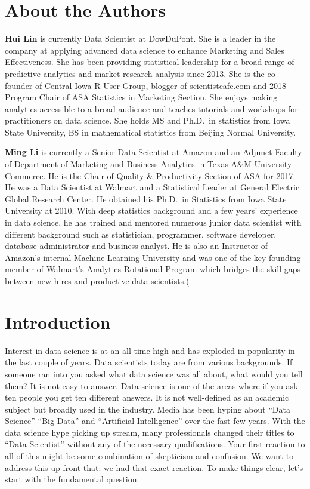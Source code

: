 \documentclass[12pt,]{krantz}
\theoremstyle{definition}
\theoremstyle{definition}
\theoremstyle{definition}
\theoremstyle{remark}
\begin{document}
\chapter*{About the Authors}\label{about-the-authors}


\textbf{Hui Lin} is currently Data Scientist at DowDuPont. She is a
leader in the company at applying advanced data science to enhance
Marketing and Sales Effectiveness. She has been providing statistical
leadership for a broad range of predictive analytics and market research
analysis since 2013. She is the co-founder of Central Iowa R User Group,
blogger of scientistcafe.com and 2018 Program Chair of ASA Statistics in
Marketing Section. She enjoys making analytics accessible to a broad
audience and teaches tutorials and workshops for practitioners on data
science. She holds MS and Ph.D.~in statistics from Iowa State
University, BS in mathematical statistics from Beijing Normal
University.

\textbf{Ming Li} is currently a Senior Data Scientist at Amazon and an
Adjunct Faculty of Department of Marketing and Business Analytics in
Texas A\&M University - Commerce. He is the Chair of Quality \&
Productivity Section of ASA for 2017. He was a Data Scientist at Walmart
and a Statistical Leader at General Electric Global Research Center. He
obtained his Ph.D.~in Statistics from Iowa State University at 2010.
With deep statistics background and a few years' experience in data
science, he has trained and mentored numerous junior data scientist with
different background such as statistician, programmer, software
developer, database administrator and business analyst. He is also an
Instructor of Amazon's internal Machine Learning University and was one
of the key founding member of Walmart's Analytics Rotational Program
which bridges the skill gaps between new hires and productive data
scientists.(

\mainmatter

\chapter{Introduction}\label{introduction}

Interest in data science is at an all-time high and has exploded in
popularity in the last couple of years. Data scientists today are from
various backgrounds. If someone ran into you asked what data science was
all about, what would you tell them? It is not easy to answer. Data
science is one of the areas where if you ask ten people you get ten
different answers. It is not well-defined as an academic subject but
broadly used in the industry. Media has been hyping about ``Data
Science'' ``Big Data'' and ``Artificial Intelligence'' over the fast few
years. With the data science hype picking up stream, many professionals
changed their titles to ``Data Scientist'' without any of the necessary
qualifications. Your first reaction to all of this might be some
combination of skepticism and confusion. We want to address this up
front that: we had that exact reaction. To make things clear, let's
start with the fundamental question.
\end{document}

